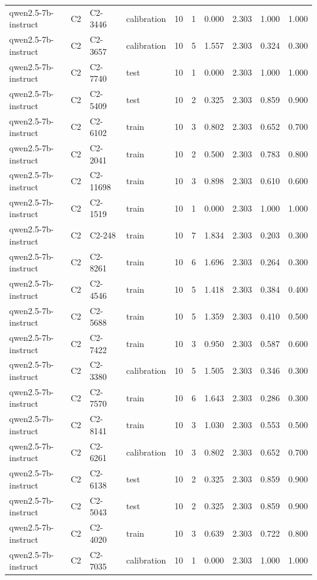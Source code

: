 \begin{table}
\begin{tabular}{llllrrrrrr}
qwen2.5-7b-instruct & C2 & C2-3446 & calibration & 10 & 1 & 0.000 & 2.303 & 1.000 & 1.000 \\
qwen2.5-7b-instruct & C2 & C2-3657 & calibration & 10 & 5 & 1.557 & 2.303 & 0.324 & 0.300 \\
qwen2.5-7b-instruct & C2 & C2-7740 & test & 10 & 1 & 0.000 & 2.303 & 1.000 & 1.000 \\
qwen2.5-7b-instruct & C2 & C2-5409 & test & 10 & 2 & 0.325 & 2.303 & 0.859 & 0.900 \\
qwen2.5-7b-instruct & C2 & C2-6102 & train & 10 & 3 & 0.802 & 2.303 & 0.652 & 0.700 \\
qwen2.5-7b-instruct & C2 & C2-2041 & train & 10 & 2 & 0.500 & 2.303 & 0.783 & 0.800 \\
qwen2.5-7b-instruct & C2 & C2-11698 & train & 10 & 3 & 0.898 & 2.303 & 0.610 & 0.600 \\
qwen2.5-7b-instruct & C2 & C2-1519 & train & 10 & 1 & 0.000 & 2.303 & 1.000 & 1.000 \\
qwen2.5-7b-instruct & C2 & C2-248 & train & 10 & 7 & 1.834 & 2.303 & 0.203 & 0.300 \\
qwen2.5-7b-instruct & C2 & C2-8261 & train & 10 & 6 & 1.696 & 2.303 & 0.264 & 0.300 \\
qwen2.5-7b-instruct & C2 & C2-4546 & train & 10 & 5 & 1.418 & 2.303 & 0.384 & 0.400 \\
qwen2.5-7b-instruct & C2 & C2-5688 & train & 10 & 5 & 1.359 & 2.303 & 0.410 & 0.500 \\
qwen2.5-7b-instruct & C2 & C2-7422 & train & 10 & 3 & 0.950 & 2.303 & 0.587 & 0.600 \\
qwen2.5-7b-instruct & C2 & C2-3380 & calibration & 10 & 5 & 1.505 & 2.303 & 0.346 & 0.300 \\
qwen2.5-7b-instruct & C2 & C2-7570 & train & 10 & 6 & 1.643 & 2.303 & 0.286 & 0.300 \\
qwen2.5-7b-instruct & C2 & C2-8141 & train & 10 & 3 & 1.030 & 2.303 & 0.553 & 0.500 \\
qwen2.5-7b-instruct & C2 & C2-6261 & calibration & 10 & 3 & 0.802 & 2.303 & 0.652 & 0.700 \\
qwen2.5-7b-instruct & C2 & C2-6138 & test & 10 & 2 & 0.325 & 2.303 & 0.859 & 0.900 \\
qwen2.5-7b-instruct & C2 & C2-5043 & test & 10 & 2 & 0.325 & 2.303 & 0.859 & 0.900 \\
qwen2.5-7b-instruct & C2 & C2-4020 & train & 10 & 3 & 0.639 & 2.303 & 0.722 & 0.800 \\
qwen2.5-7b-instruct & C2 & C2-7035 & calibration & 10 & 1 & 0.000 & 2.303 & 1.000 & 1.000 \\

\end{tabular}
\end{table}
